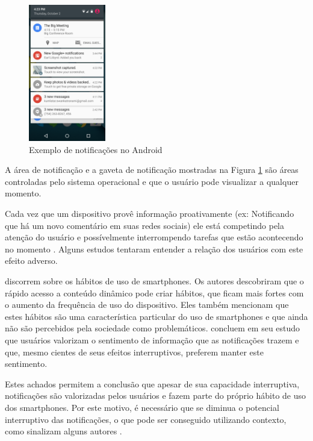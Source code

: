 \begin{figure}[h]
\centering
\includegraphics[width=0.3\textwidth]{images/notification_drawer.png}
\caption{Exemplo de notificações no Android \cite{notificationDrawer}}
\label{notification-drawer}
\end{figure}

A área de notificação e a gaveta de notificação mostradas na Figura \ref{notification-drawer} são áreas controladas pelo
sistema operacional e que o usuário pode visualizar a qualquer momento.

Cada vez que um dispositivo provê informação proativamente (ex: Notificando que há um novo comentário em suas redes
sociais) ele está competindo pela atenção do usuário e possívelmente interrompendo tarefas que estão acontecendo no momento
\cite{ho2005using}. Alguns estudos tentaram entender a relação dos usuários com este efeito adverso.

 discorrem sobre os hábitos de uso de smartphones. Os autores descobriram que o rápido acesso a
conteúdo dinâmico pode criar hábitos, que ficam mais fortes com o aumento da frequência de uso do dispositivo. Eles
também mencionam que estes hábitos são uma característica particular do uso de smartphones e que ainda não são percebidos
pela sociedade como problemáticos.  concluem em seu estudo que usuários valorizam o sentimento
de informação que as notificações trazem e que, mesmo cientes de seus efeitos interruptivos, preferem manter este sentimento.

Estes achados permitem a conclusão que apesar de sua capacidade interruptiva, notificações são valorizadas pelos
usuários e fazem parte do próprio hábito de uso dos smartphones. Por este motivo, é necessário que se diminua o potencial
interruptivo das notificações, o que pode ser conseguido utilizando contexto, como sinalizam alguns autores
\cite{ho2005using, kern2003context, iqbal2010notifications}.

